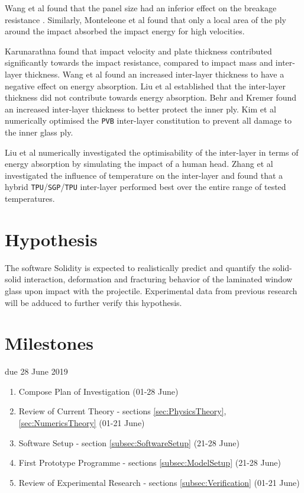 \documentclass[12pt,twoside]{article}
\theoremstyle{break}
\begin{document}
\bigbreak
Wang et al \cite{Wan18} found that the panel size had an inferior effect on the breakage resistance \cite{Wan18}. Similarly, Monteleone et al \cite{Mon04} found that only a local area of the ply around the impact absorbed the impact energy for high velocities.

\bigbreak
Karunarathna \cite{Kar14} found that impact velocity and plate thickness contributed significantly towards the impact resistance, compared to impact mass and inter-layer thickness. Wang et al \cite{Wan18} found an increased inter-layer thickness to have a negative effect on energy absorption. Liu et al \cite{Liu16} established that the inter-layer thickness did not contribute towards energy absorption. Behr and Kremer \cite{Beh99} found an increased inter-layer thickness to better protect the inner ply. Kim et al \cite{Kim16} numerically optimised the \texttt{PVB} inter-layer constitution to prevent all damage to the inner glass ply.

\bigbreak
Liu et al \cite{Liu16} numerically investigated the optimisability of the inter-layer in terms of energy absorption by simulating the impact of a human head. Zhang et al \cite{Zha19} investigated the influence of temperature on the inter-layer and found that a hybrid \texttt{TPU}/\texttt{SGP}/\texttt{TPU} inter-layer performed best over the entire range of tested temperatures.

\section{Hypothesis}

The software Solidity is expected to realistically predict and quantify the solid-solid interaction, deformation and fracturing behavior of the laminated window glass upon impact with the projectile. Experimental data from previous research will be adduced to further verify this hypothesis.

\section{Milestones}

{\color{red} due 28 June 2019}

\begin{enumerate}
    \item Compose Plan of Investigation (01-28 June)
    \item Review of Current Theory - sections \ref{sec:PhysicsTheory}, \ref{sec:NumericsTheory} (01-21 June)\\
    \item Software Setup - section \ref{subsec:SoftwareSetup} (21-28 June)
    \item First Prototype Programme - sections \ref{subsec:ModelSetup} (21-28 June)
    \item Review of Experimental Research - sections \ref{subsec:Verification} (01-21 June)
\end{enumerate}
\end{document}
